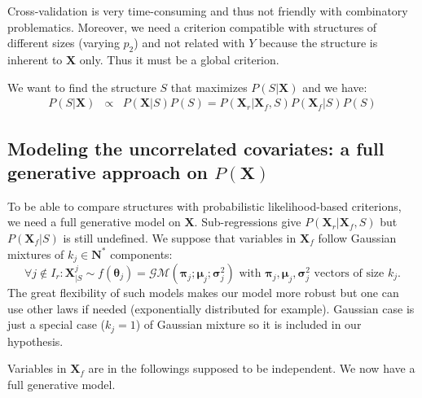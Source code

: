 \documentclass[11pt,a4paper]{article}
\begin{document}
Cross-validation is very time-consuming and thus not friendly with combinatory problematics. Moreover, we need a criterion compatible with structures of different sizes (varying $p_2$) and not related with $Y$ because the structure is inherent to $\boldsymbol{X}$ only. Thus it must be a global criterion. 	
	


We want to find the structure $S$ that maximizes $P(S|\boldsymbol{X})$ and we have:	
	\begin{eqnarray}
	 \label{approxBIC} P(S|\boldsymbol{X})&\propto & P(\boldsymbol{X}|S)P(S)
	=P(\boldsymbol{X}_r|\boldsymbol{X}_f,S)P(\boldsymbol{X}_f|S)P(S)
	\end{eqnarray}
	
	\subsection{Modeling the uncorrelated covariates: a full generative approach on $P(\boldsymbol{X})$}
	To be able to compare structures with probabilistic likelihood-based criterions, we need a full generative model on $\boldsymbol{X}$. Sub-regressions give $P(\boldsymbol{X}_r|\boldsymbol{X}_f,S) $ but $P(\boldsymbol{X}_f|S)$ is still undefined. We suppose that variables in $\boldsymbol{X}_f$ follow Gaussian mixtures of $k_j \in \mathbf{N}^*$ components: 
	\begin{equation}
			\forall j \notin I_r : \boldsymbol{X}^j_{|S} \sim f(\boldsymbol{\theta}_j)=\mathcal{GM}(\boldsymbol{\pi}_j;\boldsymbol{\mu}_j;\boldsymbol{\sigma}^2_j) \textrm{ with } \boldsymbol{\pi}_j,\boldsymbol{\mu}_j,\boldsymbol{\sigma}^2_j \textrm{ vectors of size } k_j. \label{mixtureX1}
		\end{equation}
		The great flexibility \cite{mclachlan2004finite} of such models makes our model more robust but one can use other laws if needed (exponentially distributed for example). Gaussian case is just a special case ($k_j=1$) of Gaussian mixture so it is included in our hypothesis.

		Variables in $\boldsymbol{X}_f$ are in the followings supposed to be independent.
	We now have a full generative model.
	
\end{document}

